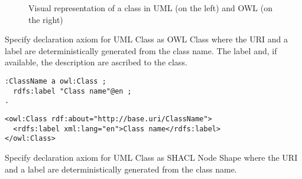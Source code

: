 \begin{figure}[!ht]
	\centering
	\begin{subfigure}{.5\textwidth}
		\centering
	\end{subfigure}%
	\begin{subfigure}{.5\textwidth}
		\centering
	\end{subfigure}
	\caption{Visual representation of a class in UML (on the left) and OWL (on the right)}
	\label{fig:class-visual}
\end{figure}

\begin{trule}
	\label{rule:class-core}
	Specify declaration axiom for UML Class as OWL Class where the URI and a label are deterministically generated from the class name. The label and, if available, the description are ascribed to the class.
\end{trule}

\vspace{-\parskip}
\begin{minipage}[b]{.45\textwidth}
\begin{lstlisting}[language=Turtle, caption={Class declaration in Turtle syntax}, captionpos=b]
:ClassName a owl:Class ;
  rdfs:label "Class name"@en ;
.
\end{lstlisting}
\end{minipage}%
\quad
\begin{minipage}[b]{.5\textwidth}
\begin{lstlisting}[language=RDF/XML, caption={Class declaration in RDF/XML syntax}, captionpos=b]
<owl:Class rdf:about="http://base.uri/ClassName">  
  <rdfs:label xml:lang="en">Class name</rdfs:label>
</owl:Class>
\end{lstlisting}
\end{minipage}

\begin{trule}
	\label{rule:class-ds}
	Specify declaration axiom for UML Class as SHACL Node Shape where the URI and a label are deterministically generated from the class name.
\end{trule}

